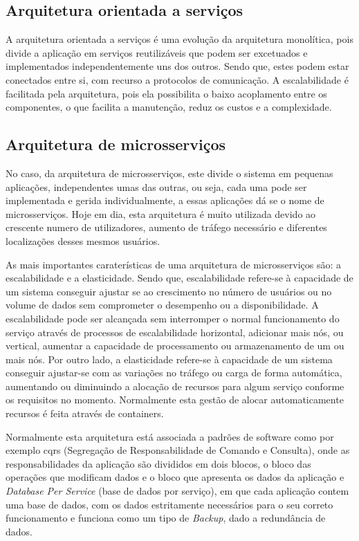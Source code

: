 \subsection{Arquitetura orientada a serviços}

A arquitetura orientada a serviços é uma evolução da arquitetura monolítica, pois divide a aplicação em serviços reutilizáveis que podem ser excetuados e implementados independentemente uns dos outros. Sendo que, estes podem estar conectados entre si, com recurso a protocolos de comunicação. A escalabilidade é facilitada pela arquitetura, pois ela possibilita o baixo acoplamento entre os componentes, o que facilita a manutenção, reduz os custos e a complexidade.

\subsection{Arquitetura de microsserviços}

No caso, da arquitetura de microsserviços, este divide o sistema em pequenas aplicações, independentes umas das outras, ou seja, cada uma pode ser implementada e gerida individualmente, a essas aplicações dá se o nome de microsserviços. Hoje em dia, esta arquitetura é muito utilizada devido ao crescente numero de utilizadores, aumento de tráfego necessário e diferentes localizações desses mesmos usuários.

As mais importantes caraterísticas de uma arquitetura de microsserviços são: a escalabilidade e a elasticidade. Sendo que, escalabilidade refere-se à capacidade de um sistema conseguir ajustar se ao crescimento no número de usuários ou no volume de dados sem comprometer o desempenho ou a disponibilidade. A escalabilidade pode ser alcançada sem interromper o normal funcionamento do serviço através de processos de escalabilidade horizontal, adicionar mais nós, ou vertical, aumentar a capacidade de processamento ou armazenamento de um ou mais nós. Por outro lado, a elasticidade refere-se à capacidade de um sistema conseguir ajustar-se com as variações no tráfego ou carga de forma automática, aumentando ou diminuindo a alocação de recursos para algum serviço conforme os requisitos no momento. Normalmente esta gestão de alocar automaticamente recursos é feita através de containers.

Normalmente esta arquitetura está associada a padrões de software como por exemplo \ac{cqrs} (Segregação de Responsabilidade de Comando e Consulta), onde as responsabilidades da aplicação são divididos em dois blocos, o bloco das operações que modificam dados e o bloco que apresenta os dados da aplicação  e \textit{Database Per Service} (base de dados por serviço), em que cada aplicação contem uma base de dados, com os dados estritamente necessários para o seu correto funcionamento e funciona como um tipo de \textit{Backup}, dado a redundância de dados.

